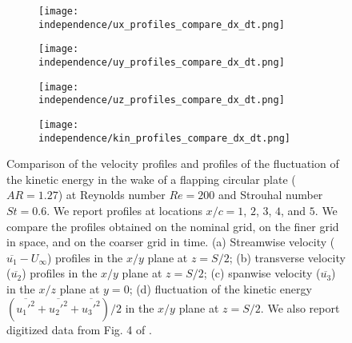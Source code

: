 \begin{figure}[!h]
  \centering
  \begin{subfigure}[c]{0.48\textwidth}
    \centering
    \texttt{[image: independence/ux\_profiles\_compare\_dx\_dt.png]}
    \caption{}
    \label{fig:independence_profiles:streamwise}
  \end{subfigure}
  \begin{subfigure}[c]{0.48\textwidth}
    \centering
    \texttt{[image: independence/uy\_profiles\_compare\_dx\_dt.png]}
    \caption{}
    \label{fig:independence_profiles:transverse}
  \end{subfigure}
  \begin{subfigure}[c]{0.48\textwidth}
    \centering
    \texttt{[image: independence/uz\_profiles\_compare\_dx\_dt.png]}
    \caption{}
    \label{fig:independence_profiles:spanwise}
  \end{subfigure}
  \begin{subfigure}[c]{0.48\textwidth}
    \centering
    \texttt{[image: independence/kin\_profiles\_compare\_dx\_dt.png]}
    \caption{}
    \label{fig:independence_profiles:kinetic}
  \end{subfigure}
  \caption{Comparison of the velocity profiles and profiles of the fluctuation of the kinetic energy in the wake of a flapping circular plate ($AR = 1.27$) at Reynolds number $Re = 200$ and Strouhal number $St = 0.6$. We report profiles at locations $x / c = 1$, $2$, $3$, $4$, and $5$. We compare the profiles obtained on the nominal grid, on the finer grid in space, and on the coarser grid in time. (a) Streamwise velocity ($\overline{u_1} - U_\infty$) profiles in the $x/y$ plane at $z = S / 2$; (b) transverse velocity ($\overline{u_2}$) profiles in the $x/y$ plane at $z = S / 2$; (c) spanwise velocity ($\overline{u_3}$) in the $x/z$ plane at $y = 0$; (d) fluctuation of the kinetic energy $( \overline{{u_1'}^2} + \overline{{u_2'}^2} + \overline{{u_3'}^2} ) / 2$ in the $x/y$ plane at $z = S / 2$. We also report digitized data from Fig. 4 of \citet{li_dong_2016}.}
  \label{fig:independence_profiles}
\end{figure}

